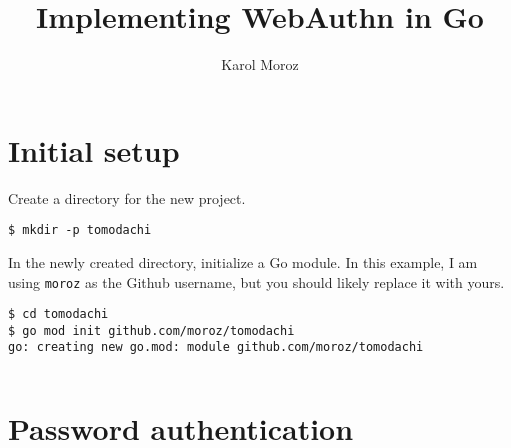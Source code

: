 \documentclass[b5paper,12pt]{book}
\title{Implementing WebAuthn in Go}
\author{Karol Moroz}
\begin{document}
\frenchspacing
\maketitle
\chapter{Initial setup}

Create a directory for the new project.

\begin{verbatim}
$ mkdir -p tomodachi
\end{verbatim}

In the newly created directory, initialize a Go module. In this example, I am using \texttt{moroz} as the Github username, but you should likely replace it with yours.

\begin{verbatim}
$ cd tomodachi
$ go mod init github.com/moroz/tomodachi
go: creating new go.mod: module github.com/moroz/tomodachi
\end{verbatim}

\inputminted[tabsize=4]{go}{code/01-setting-up/01-main.go}

\chapter{Password authentication}
\end{document}
